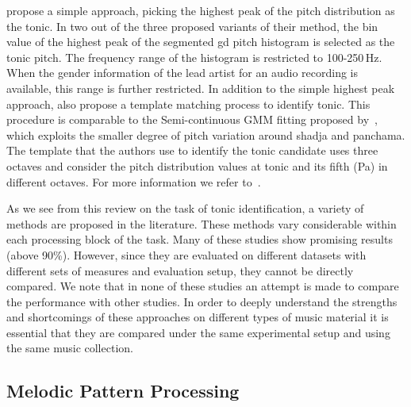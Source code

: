 \cite{Ashwin_Istanbul2012} propose a simple approach, picking the highest peak of the pitch distribution as the tonic. In two out of the three proposed variants of their method, the bin value of the highest peak of the segmented \gls{gd} pitch histogram is selected as the tonic pitch. The frequency range of the histogram is restricted to 100-250\,Hz. When the gender information of the lead artist for an audio recording is available, this range is further restricted. In addition to the simple highest peak approach, \cite{Ashwin_Istanbul2012} also propose a template matching process to identify tonic. This procedure is comparable to the Semi-continuous GMM fitting proposed by~\citep{ranjani2011carnatic}, which exploits the smaller degree of pitch variation around \gls{shadja} and \gls{panchama}. The template that the authors use to identify the tonic candidate uses three octaves and consider the pitch distribution values at tonic and its fifth (Pa) in different octaves. For more information we refer to~\cite{Gulati2014Tonic}.

As we see from this review on the task of tonic identification, a variety of methods are proposed in the literature. These methods vary considerable within each processing block of the task. Many of these studies show promising results (above 90\%). However, since they are evaluated on different datasets with different sets of measures and evaluation setup, they cannot be directly compared.  We note that in none of these studies an attempt is made to compare the performance with other studies. In order to deeply understand the strengths and shortcomings of these approaches on different types of music material it is essential that they are compared under the same experimental setup and using the same music collection. 


\subsection{Melodic Pattern Processing}
\label{sec:sota_pattern_processing_iam}


